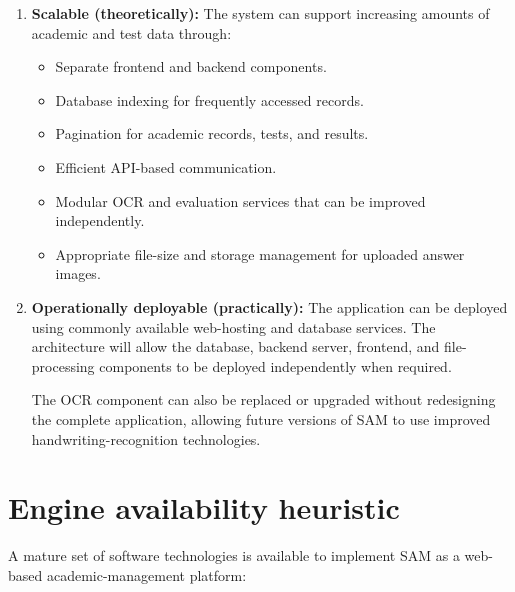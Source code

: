 \documentclass[11pt,a4paper]{article}
\begin{document}
\begin{enumerate}[leftmargin=0.7cm]
    \item \textbf{Scalable (theoretically):} The system can support increasing amounts of academic and test data through:

\begin{itemize}
    \item Separate frontend and backend components.

    \item Database indexing for frequently accessed records.

    \item Pagination for academic records, tests, and results.

    \item Efficient API-based communication.

    \item Modular OCR and evaluation services that can be improved independently.

    \item Appropriate file-size and storage management for uploaded answer images.
\end{itemize}
    
    \item \textbf{Operationally deployable (practically):} The application can be deployed using commonly available web-hosting and database services. The architecture will allow the database, backend server, frontend, and file-processing components to be deployed independently when required.

The OCR component can also be replaced or upgraded without redesigning the complete application, allowing future versions of SAM to use improved handwriting-recognition technologies.

\end{enumerate}

\section{Engine availability heuristic}
A mature set of software technologies is available to implement SAM as a web-based academic-management platform:
\end{document}
